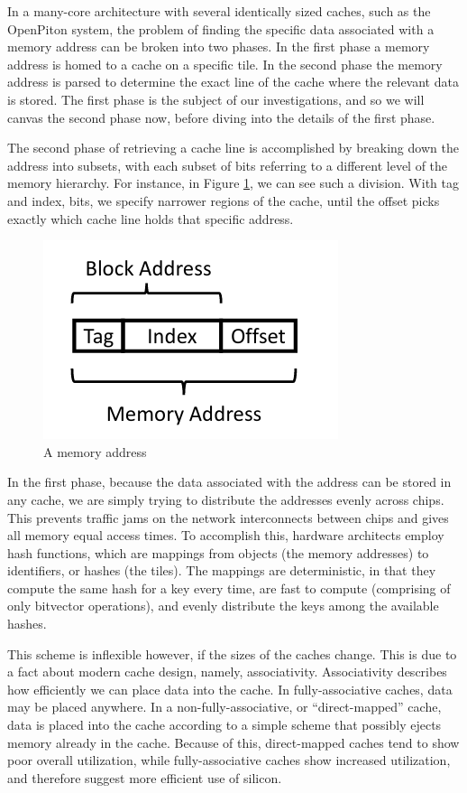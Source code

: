 In a many-core architecture with several identically sized caches, such as the
OpenPiton system, the problem of finding the specific data associated with a
memory address can be broken into two phases.  In the first phase a memory
address is homed to a cache on a specific tile.  In the second phase the memory
address is parsed to determine the exact line of the cache where the relevant
data is stored.  The first phase is the subject of our investigations, and so we
will canvas the second phase now, before diving into the details of the first
phase.

The second phase of retrieving a cache line is accomplished by breaking down the
address into subsets, with each subset of bits referring to a different level of
the memory hierarchy.  For instance, in Figure \ref{Fig:memory_addr}, we can see
such a division.  With tag and index, bits, we specify narrower regions of the
cache, until the offset picks exactly which cache line holds that specific
address.

\begin{figure}[h]
  \centering
  \includegraphics[scale=0.4]{figures/memory_addr.png}
  \caption{A memory address}
  \label{Fig:memory_addr}
\end{figure}

In the first phase, because the data associated with the address can be stored
in any cache, we are simply trying to distribute the addresses evenly across chips.  This prevents traffic jams on the network interconnects between
chips and gives all memory equal access times.  To accomplish this, hardware
architects employ hash functions, which are mappings from objects (the memory
addresses) to identifiers, or hashes (the tiles).  The mappings are
deterministic, in that they compute the same hash for a key every time, are fast
to compute (comprising of only bitvector operations), and evenly distribute the
keys among the available hashes.

This scheme is inflexible however, if the sizes of the caches change.  This is
due to a fact about modern cache design, namely, associativity.  Associativity
describes how efficiently we can place data into the cache.  In
fully-associative caches, data may be placed anywhere.  In a
non-fully-associative, or ``direct-mapped'' cache, data is placed into the cache
according to a simple scheme that possibly ejects memory already in the cache.
Because of this, direct-mapped caches tend to show poor overall utilization,
while fully-associative caches show increased utilization, and therefore suggest
more efficient use of silicon.

